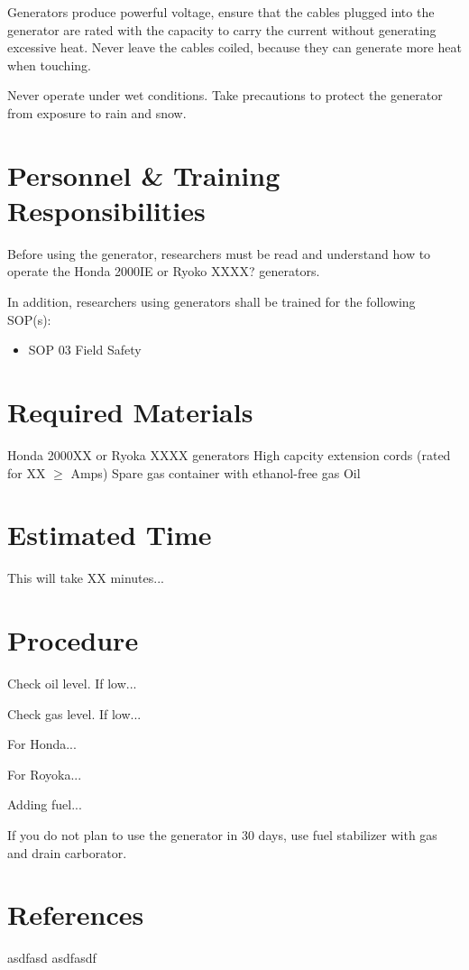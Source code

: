 \documentclass[12pt]{../SOP3_alpha}
\begin{document}
\NP Generators produce powerful voltage, ensure that the cables plugged into the generator are rated with the capacity to carry the current without generating excessive heat. Never leave the cables coiled, because they can generate more heat when touching.

\NP Never operate under wet conditions. Take precautions to protect the generator from exposure to rain and snow. 

\section{Personnel \& Training Responsibilities}

\NP Before using the generator, researchers must be read and understand how to operate the Honda 2000IE or Ryoko XXXX? generators. 

\NP In addition, researchers using generators shall be trained for the following SOP(s):

\begin{itemize}
  \item SOP 03 Field Safety
\end{itemize}

\section{Required Materials}

\NP Honda 2000XX or Ryoka XXXX generators
\NP High capcity extension cords (rated for XX $\geq$ Amps)
\NP Spare gas container with ethanol-free gas
\NP Oil

\section{Estimated Time}

\NP This will take XX minutes...

\section{Procedure}

\NP Check oil level. If low...

\NP Check gas level. If low...

\NP For Honda...

\NP For Royoka...

\NP Adding fuel...

\NP If you do not plan to use the generator in 30 days, use fuel stabilizer with gas and drain carborator. 

\section{References}

\NP asdfasd asdfasdf 
\end{document}
